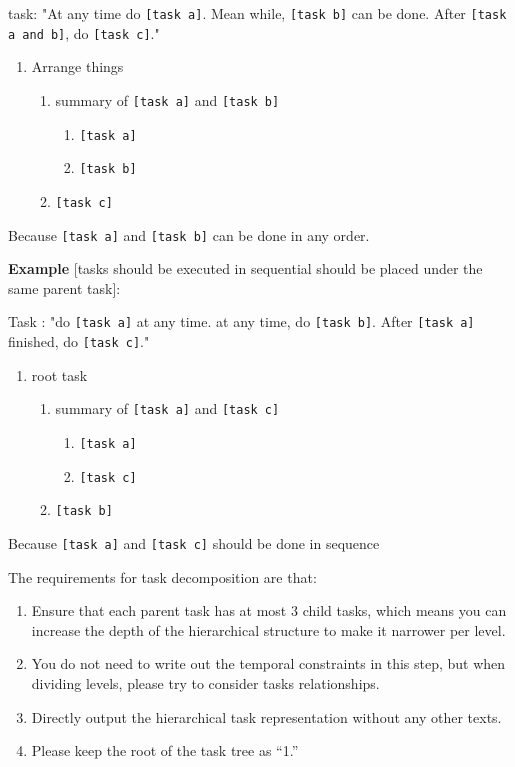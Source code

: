 \documentclass{article}
\begin{document}
task: "At any time do \verb|[task a]|. Mean while, \verb|[task b]| can be done. After \verb|[task a and b]|, do \verb|[task c]|."
\begin{enumerate}
    \item  Arrange things
    \begin{enumerate}
    \item summary of \verb|[task a]| and \verb|[task b]|
    \begin{enumerate}
        \item \verb|[task a]|
        \item \verb|[task b]|
    \end{enumerate}
    \item \verb|[task c]|
    \end{enumerate}
\end{enumerate}
Because \verb|[task a]| and \verb|[task b]| can be done in any order.
    
\textbf{Example} [tasks should be executed in sequential should be placed under the same parent task]:

Task : "do \verb|[task a]| at any time. at any time, do \verb|[task b]|. After \verb|[task a]| finished, do \verb|[task c]|."
\begin{enumerate}
    \item   root task
    \begin{enumerate}
    \item summary of \verb|[task a]| and \verb|[task c]|
    \begin{enumerate}
        \item \verb|[task a]|
        \item \verb|[task c]|
    \end{enumerate}
    \item \verb|[task b]|
    \end{enumerate}
\end{enumerate}
Because \verb|[task a]| and \verb|[task c]| should be done in sequence
    
The requirements for task decomposition are that:
\begin{enumerate}
    \item Ensure that each parent task has at most 3 child tasks, which means you can increase the depth of the hierarchical structure to make it narrower per level.
    \item You do not need to write out the temporal constraints in this step, but when dividing levels, please try to consider tasks relationships.
    \item Directly output the hierarchical task representation without any other texts.
    \item Please keep the root of the task tree as ``1.''
\end{enumerate}
\end{document}
